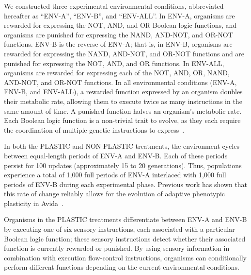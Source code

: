 \documentclass[utf8]{frontiersSCNS} %
\begin{document}
\begin{raggedbottom}

We constructed three experimental environmental conditions, abbreviated hereafter as ``ENV-A'', ``ENV-B'', and ``ENV-ALL''.
In ENV-A, organisms are rewarded for expressing the NOT, AND, and OR Boolean logic functions, and organisms are punished for expressing the NAND, AND-NOT, and OR-NOT functions. 
ENV-B is the reverse of ENV-A; that is, in ENV-B, organisms are rewarded for expressing the NAND, AND-NOT, and OR-NOT functions and are punished for expressing the NOT, AND, and OR functions.
In ENV-ALL, organisms are rewarded for expressing each of the NOT, AND, OR, NAND, AND-NOT, and OR-NOT functions.
In all environmental conditions (ENV-A, ENV-B, and ENV-ALL), a rewarded function expressed by an organism doubles their metabolic rate, allowing them to execute twice as many instructions in the same amount of time.
A punished function halves an organism's metabolic rate.
Each Boolean logic function is a non-trivial trait to evolve, as they each require the coordination of multiple genetic instructions to express~\citep{lenski_evolutionary_2003}.


In both the PLASTIC and NON-PLASTIC treatments, the environment cycles between equal-length periods of ENV-A and ENV-B.
Each of these periods persist for 100 updates (approximately 15 to 20 generations).
Thus, populations experience a total of 1,000 full periods of ENV-A interlaced with 1,000 full periods of ENV-B during each experimental phase.
Previous work has shown that this rate of change reliably allows for the evolution of adaptive phenotypic plasticity in Avida~\citep{clune_investigating_2007,lalejini_evolutionary_2016}.

Organisms in the PLASTIC treatments differentiate between ENV-A and ENV-B by executing one of six sensory instructions, each associated with a particular Boolean logic function; these sensory instructions detect whether their associated function is currently rewarded or punished.
By using sensory information in combination with execution flow-control instructions, organisms can conditionally perform different functions depending on the current environmental conditions.


\end{raggedbottom}
\end{document}
